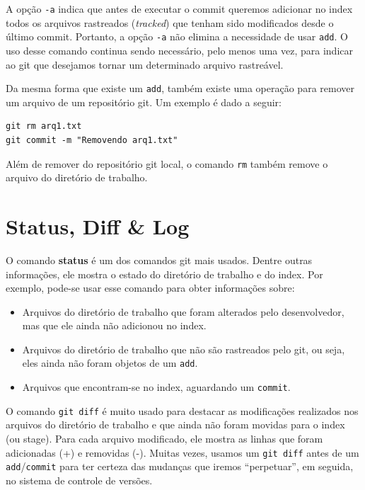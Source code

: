 \documentclass[
  11pt,
  twoside]{book}
\newcommand{\passthrough}[1]{#1}
\begin{document}
A opção \passthrough{\lstinline!-a!} indica que antes de executar o
commit queremos adicionar no index todos os arquivos rastreados
(\emph{tracked}) que tenham sido modificados desde o último commit.
Portanto, a opção \passthrough{\lstinline!-a!} não elimina a necessidade
de usar \passthrough{\lstinline!add!}. O uso desse comando continua
sendo necessário, pelo menos uma vez, para indicar ao git que desejamos
tornar um determinado arquivo rastreável.

Da mesma forma que existe um \passthrough{\lstinline!add!}, também
existe uma operação para remover um arquivo de um repositório git. Um
exemplo é dado a seguir:

\begin{lstlisting}
git rm arq1.txt
git commit -m "Removendo arq1.txt"
\end{lstlisting}

Além de remover do repositório git local, o comando
\passthrough{\lstinline!rm!} também remove o arquivo do diretório de
trabalho.

\hypertarget{status-diff-log}{%
\section{Status, Diff \& Log}\label{status-diff-log}}

 O comando \textbf{status} é um dos comandos git mais
usados. Dentre outras informações, ele mostra o estado do diretório de
trabalho e do index. Por exemplo, pode-se usar esse comando para obter
informações sobre:

\begin{itemize}
\item
  Arquivos do diretório de trabalho que foram alterados pelo
  desenvolvedor, mas que ele ainda não adicionou no index.
\item
  Arquivos do diretório de trabalho que não são rastreados pelo git, ou
  seja, eles ainda não foram objetos de um
  \passthrough{\lstinline!add!}.
\item
  Arquivos que encontram-se no index, aguardando um
  \passthrough{\lstinline!commit!}.
\end{itemize}

O comando \passthrough{\lstinline!git diff!}  é muito
usado para destacar as modificações realizados nos arquivos do diretório
de trabalho e que ainda não foram movidas para o index (ou stage). Para
cada arquivo modificado, ele mostra as linhas que foram adicionadas (+)
e removidas (-). Muitas vezes, usamos um
\passthrough{\lstinline!git diff!} antes de um
\passthrough{\lstinline!add!}/\passthrough{\lstinline!commit!} para ter
certeza das mudanças que iremos ``perpetuar'', em seguida, no sistema de
controle de versões.
\end{document}
